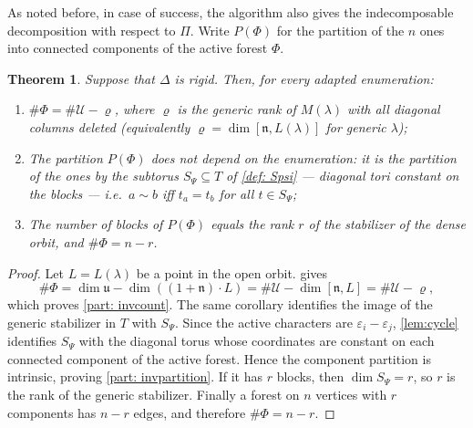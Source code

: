 \documentclass[12pt]{article}
\newtheorem{theorem}{Theorem}[section]
\newcommand{\uu}{\mathfrak{u}}
\newcommand{\nn}{\mathfrak{n}}
\newcommand{\U}{\mathcal{U}}
\newcommand{\IM}{\Delta}
\begin{document}
As noted before, in case of success, the algorithm also gives the indecomposable decomposition with respect to $\Pi$.
Write $P(\Phi)$ for the partition of the $n$ ones into connected components of the active forest $\Phi$.

\begin{theorem}\label{thm:rigidityinv}
Suppose that $\IM$ is rigid.  Then, for every adapted enumeration:
\begin{enumerate}
\item \label{part: invcount} $\#\Phi=\#\U-\varrho$, where $\varrho$ is the generic rank
of $M(\lambda)$ with all diagonal columns deleted (equivalently
$\varrho=\dim[\nn,L(\lambda)]$ for generic $\lambda$);
\item \label{part: invpartition} The partition $P(\Phi)$ does not depend on the enumeration:
it is the partition of the ones by the subtorus $S_\Psi\subseteq T$ of \cref{def: Spsi}
 --- diagonal tori constant on the blocks --- i.e.\ $a\sim b$ iff $t_a=t_b$ for all $t\in S_\Psi$;
\item \label{part: invblocks} The number of blocks of $P(\Phi)$ equals the rank $r$ of
the stabilizer of the dense orbit, and $\#\Phi=n-r$.
\end{enumerate}
\end{theorem}

\begin{proof}
Let $L=L(\lambda)$ be a point in the open orbit.   gives
\[
 \#\Phi=\dim\uu-\dim((1+\nn)\cdot L)=\#\U-\dim[\nn,L]=\#\U-\varrho,
\]
which proves \cref{part: invcount}.  The same corollary identifies the image of the generic stabilizer in
$T$ with $S_\Psi$.  Since the active characters are
$\varepsilon_i-\varepsilon_j$, \cref{lem:cycle} identifies $S_\Psi$ with the diagonal torus
whose coordinates are constant on each connected component of the active forest.  Hence
the component partition is intrinsic, proving \cref{part: invpartition}.  If it has $r$ blocks, then
$\dim S_\Psi=r$, so $r$ is the rank of the generic stabilizer.  Finally a forest on $n$
vertices with $r$ components has $n-r$ edges, and therefore $\#\Phi=n-r$.
\end{proof}
\end{document}
